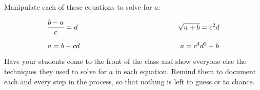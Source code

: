 

Manipulate each of these equations to solve for $a$:

$${{b - a} \over c} = d \hbox{\hskip 140pt} \sqrt{a + b} = c^2 d$$







$$a = b - cd \hbox{\hskip 140pt} a = c^4 d^2 - b$$







Have your students come to the front of the class and show everyone else the techniques they used to solve for $a$ in each equation.  Remind them to document each and every step in the process, so that nothing is left to guess or to chance.




